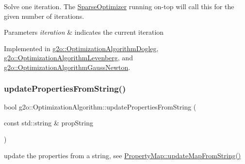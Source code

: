 Solve one iteration. The \mbox{\hyperlink{classg2o_1_1_sparse_optimizer}{Sparse\+Optimizer}} running on-\/top will call this for the given number of iterations. 
\begin{DoxyParams}{Parameters}
{\em iteration} & indicates the current iteration \\
\hline
\end{DoxyParams}


Implemented in \mbox{\hyperlink{classg2o_1_1_optimization_algorithm_dogleg_ace62fd809c18655bd7ff104285748610}{g2o\+::\+Optimization\+Algorithm\+Dogleg}}, \mbox{\hyperlink{classg2o_1_1_optimization_algorithm_levenberg_a7140fa989b54eac4e09ba17829dcada0}{g2o\+::\+Optimization\+Algorithm\+Levenberg}}, and \mbox{\hyperlink{classg2o_1_1_optimization_algorithm_gauss_newton_aba0b67eecaca01c576de7e605e5af5f1}{g2o\+::\+Optimization\+Algorithm\+Gauss\+Newton}}.

\mbox{\label{classg2o_1_1_optimization_algorithm_aa05a6380f936c728a574c7c272bcc524}} 
\subsubsection{\texorpdfstring{update\+Properties\+From\+String()}{updatePropertiesFromString()}}
{\footnotesize\ttfamily bool g2o\+::\+Optimization\+Algorithm\+::update\+Properties\+From\+String (\begin{DoxyParamCaption}\item[{const std\+::string \&}]{prop\+String }\end{DoxyParamCaption})}

update the properties from a string, see \mbox{\hyperlink{classg2o_1_1_property_map_a0407e6a72afafd608f13cfdffc6ffc06}{Property\+Map\+::update\+Map\+From\+String()}} \mbox{\label{classg2o_1_1_optimization_algorithm_a350d9bb4ee701e40b75e67d26293a4bd}} 
